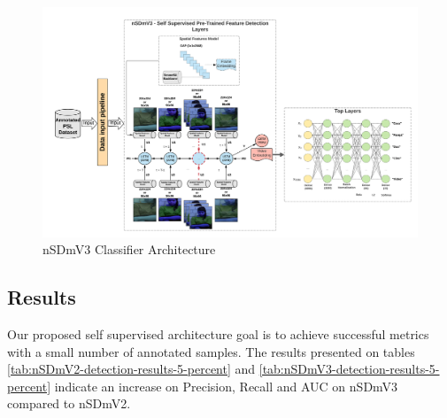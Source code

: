 \documentclass[twocolumn,conference]{article}
\begin{document}
\begin{figure}[hbt!]
\includegraphics[width=\textwidth,height=\textheight,keepaspectratio]{images/nsdmv3-classifier-architecture.png}
\caption{nSDmV3 Classifier Architecture}
\label{fig:nsdmv3-classifier-architecture}
\end{figure}

\subsection{Results}\label{results}
Our proposed self supervised architecture goal is to achieve successful metrics with a small number of annotated samples. The results presented on tables \ref{tab:nSDmV2-detection-results-5-percent} and \ref{tab:nSDmV3-detection-results-5-percent} indicate an increase on Precision, Recall and AUC on nSDmV3 compared to nSDmV2.
\end{document}
